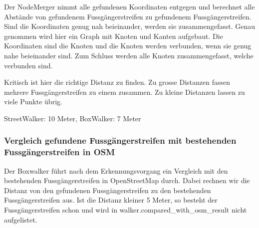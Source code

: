 Der NodeMerger nimmt alle gefundenen Koordinaten entgegen und berechnet alle Abstände von gefundenem Fussgängerstreifen zu gefundenem Fussgängerstreifen. Sind die Koordinaten genug nah beieinander, werden sie zusammengefasst. Genau genommen wird hier ein Graph mit Knoten und Kanten aufgebaut. Die Koordinaten sind die Knoten und die Knoten werden verbunden, wenn sie genug nahe beieinander sind. Zum Schluss werden alle Knoten zusammengefasst, welche verbunden sind.

Kritisch ist hier die richtige Distanz zu finden. Zu grosse Distanzen fassen mehrere Fussgängerstreifen zu einem zusammen. Zu kleine Distanzen lassen zu viele Punkte übrig.

 StreetWalker: 10 Meter, BoxWalker: 7 Meter

\subsubsection{Vergleich gefundene Fussgängerstreifen mit bestehenden Fussgängerstreifen in OSM}
Der Boxwalker führt nach dem Erkennungsvorgang ein Vergleich mit den bestehenden Fussgängerstreifen in OpenStreetMap durch. Dabei rechnen wir die Distanz von den gefundenen Fussgängerstreifen zu den bestehenden Fussgängerstreifen aus. Ist die Distanz kleiner 5 Meter, so besteht der Fussgängerstreifen schon und wird in walker.compared\_with\_osm\_result nicht aufgelistet.









